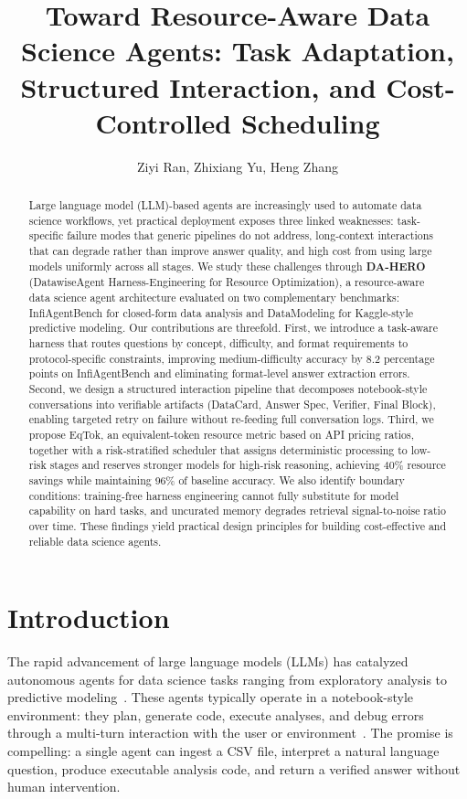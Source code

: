 \documentclass[letterpaper]{article} %
\title{Toward Resource-Aware Data Science Agents: Task Adaptation, Structured Interaction, and Cost-Controlled Scheduling}
\author{
    Ziyi Ran\equalcontrib, Zhixiang Yu\equalcontrib, Heng Zhang\equalcontrib\\
}
\begin{document}
\maketitle

\begin{abstract}
Large language model (LLM)-based agents are increasingly used to automate data science workflows, yet practical deployment exposes three linked weaknesses: task-specific failure modes that generic pipelines do not address, long-context interactions that can degrade rather than improve answer quality, and high cost from using large models uniformly across all stages. We study these challenges through \textbf{DA-HERO} (DatawiseAgent Harness-Engineering for Resource Optimization), a resource-aware data science agent architecture evaluated on two complementary benchmarks: InfiAgentBench for closed-form data analysis and DataModeling for Kaggle-style predictive modeling. Our contributions are threefold. First, we introduce a task-aware harness that routes questions by concept, difficulty, and format requirements to protocol-specific constraints, improving medium-difficulty accuracy by 8.2 percentage points on InfiAgentBench and eliminating format-level answer extraction errors. Second, we design a structured interaction pipeline that decomposes notebook-style conversations into verifiable artifacts (DataCard, Answer Spec, Verifier, Final Block), enabling targeted retry on failure without re-feeding full conversation logs. Third, we propose EqTok, an equivalent-token resource metric based on API pricing ratios, together with a risk-stratified scheduler that assigns deterministic processing to low-risk stages and reserves stronger models for high-risk reasoning, achieving 40\% resource savings while maintaining 96\% of baseline accuracy. We also identify boundary conditions: training-free harness engineering cannot fully substitute for model capability on hard tasks, and uncurated memory degrades retrieval signal-to-noise ratio over time. These findings yield practical design principles for building cost-effective and reliable data science agents.
\end{abstract}

\section{Introduction}

The rapid advancement of large language models (LLMs) has catalyzed autonomous agents for data science tasks ranging from exploratory analysis to predictive modeling~\cite{wang2024data, guo2024data}. These agents typically operate in a notebook-style environment: they plan, generate code, execute analyses, and debug errors through a multi-turn interaction with the user or environment~\cite{infiagentbench, chen2021evaluating}. The promise is compelling: a single agent can ingest a CSV file, interpret a natural language question, produce executable analysis code, and return a verified answer without human intervention.
\end{document}
